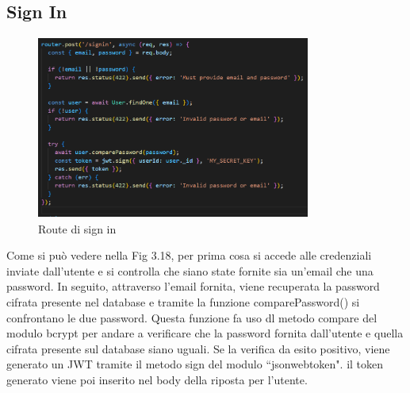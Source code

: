 \subsection*{Sign In}

\begin{figure}[H]
    \centering
    \includegraphics[width=9cm, height=6cm]{images/signinServer.png}
    \caption[differenzeiteot]{Route di sign in}
    \label{fig:Route sign in}
\end{figure}

Come si pu\`o vedere nella Fig 3.18, per prima cosa si accede alle credenziali inviate dall'utente e si controlla che siano state fornite sia un'email che una password. In seguito, attraverso l'email fornita, viene recuperata la password cifrata presente
nel database e tramite la funzione comparePassword() si confrontano le due password. Questa funzione fa uso dl metodo compare del modulo bcrypt per andare a verificare che la password fornita dall'utente e quella cifrata presente sul database siano uguali.
Se la verifica da esito positivo, viene generato un JWT tramite il metodo sign del modulo ``jsonwebtoken". il token generato viene poi inserito nel body della riposta per l'utente.
